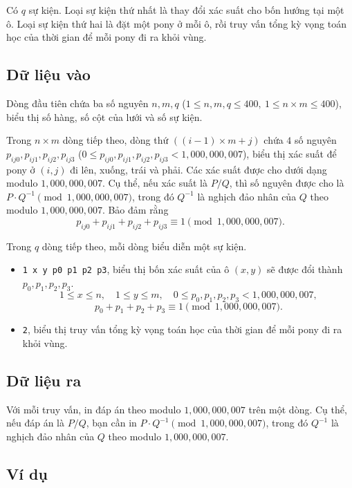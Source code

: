 \documentclass[11pt]{article}
\begin{document}
Có \(q\) sự kiện. Loại sự kiện thứ nhất là thay đổi xác suất cho bốn hướng
tại một ô. Loại sự kiện thứ hai là đặt một pony ở mỗi ô, rồi truy vấn tổng kỳ
vọng toán học của thời gian để mỗi pony đi ra khỏi vùng.

\subsection*{Dữ liệu vào}

Dòng đầu tiên chứa ba số nguyên \(n,m,q\)
(\(1\le n,m,q\le 400,\ 1\le n\times m\le 400\)), biểu thị số hàng, số cột của
lưới và số sự kiện.

Trong \(n\times m\) dòng tiếp theo, dòng thứ \(((i-1)\times m+j)\) chứa
\(4\) số nguyên \(p_{ij0},p_{ij1},p_{ij2},p_{ij3}\)
(\(0\le p_{ij0},p_{ij1},p_{ij2},p_{ij3}<1{,}000{,}000{,}007\)), biểu thị xác
suất để pony ở \((i,j)\) đi lên, xuống, trái và phải. Các xác suất được cho
dưới dạng modulo \(1{,}000{,}000{,}007\). Cụ thể, nếu xác suất là
\(P/Q\), thì số nguyên được cho là
\(P\cdot Q^{-1}\pmod {1{,}000{,}000{,}007}\), trong đó \(Q^{-1}\) là nghịch
đảo nhân của \(Q\) theo modulo \(1{,}000{,}000{,}007\). Bảo đảm rằng
\[
  p_{ij0}+p_{ij1}+p_{ij2}+p_{ij3}\equiv 1
  \pmod {1{,}000{,}000{,}007}.
\]

Trong \(q\) dòng tiếp theo, mỗi dòng biểu diễn một sự kiện.
\begin{itemize}
  \item \texttt{1 x y p0 p1 p2 p3}, biểu thị bốn xác suất của ô \((x,y)\) sẽ
  được đổi thành \(p_0,p_1,p_2,p_3\).
  \[
    1\le x\le n,\quad 1\le y\le m,\quad
    0\le p_0,p_1,p_2,p_3<1{,}000{,}000{,}007,
  \]
  \[
    p_0+p_1+p_2+p_3\equiv 1\pmod {1{,}000{,}000{,}007}.
  \]
  \item \texttt{2}, biểu thị truy vấn tổng kỳ vọng toán học của thời gian để
  mỗi pony đi ra khỏi vùng.
\end{itemize}

\subsection*{Dữ liệu ra}

Với mỗi truy vấn, in đáp án theo modulo \(1{,}000{,}000{,}007\) trên một
dòng. Cụ thể, nếu đáp án là \(P/Q\), bạn cần in
\(P\cdot Q^{-1}\pmod {1{,}000{,}000{,}007}\), trong đó \(Q^{-1}\) là nghịch
đảo nhân của \(Q\) theo modulo \(1{,}000{,}000{,}007\).

\subsection*{Ví dụ}
\end{document}

